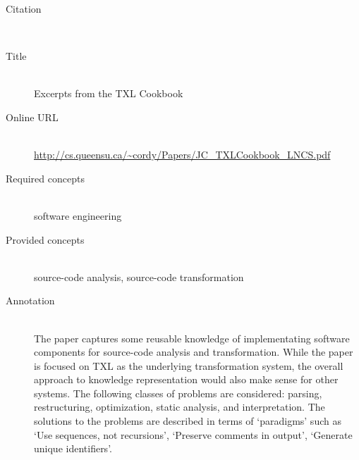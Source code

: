\begin{description}
\item[Citation]\mbox{}\\
\cite{Cordy11}
\item[Title]\mbox{}\\
Excerpts from the TXL Cookbook
\item[Online URL]\mbox{}\\
{\footnotesize\url{http://cs.queensu.ca/~cordy/Papers/JC_TXLCookbook_LNCS.pdf}}
\item[Required concepts]\mbox{}\\
software engineering\item[Provided concepts]\mbox{}\\
source-code analysis, source-code transformation\item[Annotation]\mbox{}\\
The paper captures some reusable knowledge of implementating software components for source-code analysis and transformation. While the paper is focused on TXL as the underlying transformation system, the overall approach to knowledge representation would also make sense for other systems. The following classes of problems are considered: parsing, restructuring, optimization, static analysis, and interpretation. The solutions to the problems are described in terms of `paradigms' such as `Use sequences, not recursions', `Preserve comments in output', `Generate unique identifiers'.
\end{description}

